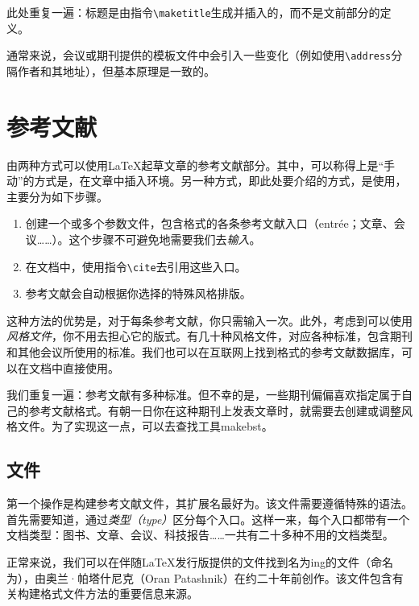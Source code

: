 此处重复一遍：标题是由指令\verb|\maketitle|生成并插入的，而不是文前部分的定义。

通常来说，会议或期刊提供的模板文件中会引入一些变化（例如使用\verb|\address|分隔作者和其地址），但基本原理是一致的。

\section{参考文献}

由两种方式可以使用\LaTeX 起草文章的参考文献部分。其中，可以称得上是``手动''的方式是，在文章中插入环境。另一种方式，即此处要介绍的方式，是使用\bib ，主要分为如下步骤。

\begin{enumerate}
    \item 创建一个或多个参数文件，包含\bib 格式的各条参考文献入口（entrée；文章、会议……）。这个步骤不可避免地需要我们去\emph{输入}。
    \item 在文档中，使用指令\verb|\cite|去引用这些入口。
    \item 参考文献会自动根据你选择的特殊风格排版。
\end{enumerate}

这种方法的优势是，对于每条参考文献，你只需输入一次。此外，考虑到可以使用\emph{风格文件}，你不用去担心它的版式。有几十种风格文件，对应各种标准，包含期刊和其他会议所使用的标准。我们也可以在互联网上找到\bib 格式的参考文献数据库，可以在文档中直接使用。

我们重复一遍：参考文献有多种标准。但不幸的是，一些期刊偏偏喜欢指定属于自己的参考文献格式。有朝一日你在这种期刊上发表文章时，就需要去创建或调整风格文件。为了实现这一点，可以去查找工具\textsf{makebst}。

\subsection{文件}

第一个操作是构建参考文献文件，其扩展名最好为。该文件需要遵循特殊的语法。首先需要知道，\bib 通过\emph{类型（type）}区分每个入口。这样一来，每个入口都带有一个文档类型：图书、文章、会议、科技报告……一共有二十多种不用的文档类型。

\begin{ii}
正常来说，我们可以在伴随\LaTeX 发行版提供的文件找到名为\bib ing的文件（命名为），由奥兰·帕塔什尼克（Oran Patashnik）在约二十年前创作。该文件包含有关构建\bib 格式文件方法的重要信息来源。
\end{ii}

